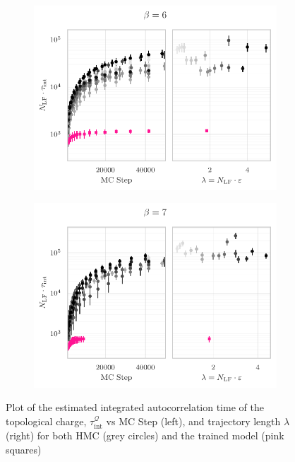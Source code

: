 \documentclass{article} %
\begin{document}
%
\begin{figure}[htpb]
   \centering
   \begin{subfigure}{0.4\textwidth}
      \includegraphics[width=\textwidth]{figures/autocorr_plots_2021_03_09/autocorr_vs_traj_len_2152_b6.pdf}
   \end{subfigure}
   \begin{subfigure}{0.4\textwidth}
      \includegraphics[width=\textwidth]{figures/autocorr_plots_2021_03_09/autocorr_vs_traj_len_2152_b7.pdf}
   \end{subfigure}
   \caption{\label{fig:autocorrbeta67}Plot of the estimated integrated autocorrelation time of the topological charge,
      \(\tau_{\mathrm{int}}^{\mathcal{Q}}\) vs MC Step (left), and trajectory length \(\lambda\) (right) for both HMC
   (grey circles) and the trained model (pink squares)}
\end{figure}
%
%
\end{document}
